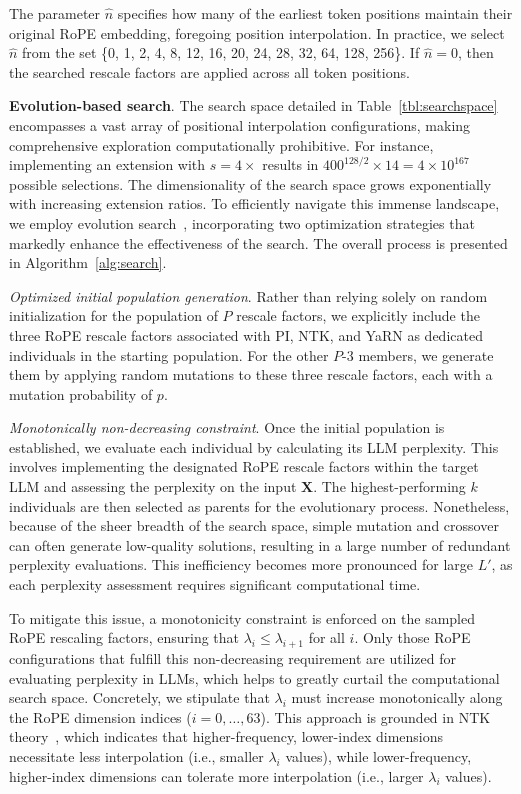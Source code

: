 The parameter $\hat{n}$ specifies how many of the earliest token positions maintain their original RoPE embedding, foregoing position interpolation. In practice, we select $\hat{n}$ from the set \{0, 1, 2, 4, 8, 12, 16, 20, 24, 28, 32, 64, 128, 256\}. If $\hat{n}=0$, then the searched rescale factors are applied across all token positions.

\textbf{Evolution-based search}. The search space detailed in Table~\ref{tbl:searchspace} encompasses a vast array of positional interpolation configurations, making comprehensive exploration computationally prohibitive. For instance, implementing an extension with $s=4\times$ results in $400^{128/2}\times14=4\times10^{167}$ possible selections. The dimensionality of the search space grows exponentially with increasing extension ratios. To efficiently navigate this immense landscape, we employ evolution search~\cite{guo2020single}, incorporating two optimization strategies that markedly enhance the effectiveness of the search. The overall process is presented in Algorithm~\ref{alg:search}.

\textit{Optimized initial population generation}. Rather than relying solely on random initialization for the population of $P$ rescale factors, we explicitly include the three RoPE rescale factors associated with PI, NTK, and YaRN as dedicated individuals in the starting population. For the other $P$-3 members, we generate them by applying random mutations to these three rescale factors, each with a mutation probability of $p$.

\textit{Monotonically non-decreasing constraint}. Once the initial population is established, we evaluate each individual by calculating its LLM perplexity. This involves implementing the designated RoPE rescale factors within the target LLM and assessing the perplexity on the input $\mathbf{X}$. The highest-performing $k$ individuals are then selected as parents for the evolutionary process. Nonetheless, because of the sheer breadth of the search space, simple mutation and crossover can often generate low-quality solutions, resulting in a large number of redundant perplexity evaluations. This inefficiency becomes more pronounced for large $L'$, as each perplexity assessment requires significant computational time.

To mitigate this issue, a monotonicity constraint is enforced on the sampled RoPE rescaling factors, ensuring that $\lambda_i\le \lambda_{i+1}$ for all $i$. Only those RoPE configurations that fulfill this non-decreasing requirement are utilized for evaluating perplexity in LLMs, which helps to greatly curtail the computational search space. Concretely, we stipulate that $\lambda_i$ must increase monotonically along the RoPE dimension indices ($i=0, \ldots, 63$). This approach is grounded in NTK theory~\cite{jacot2018neural,tancik2020fourier,ntk}, which indicates that higher-frequency, lower-index dimensions necessitate less interpolation (i.e., smaller $\lambda_i$ values), while lower-frequency, higher-index dimensions can tolerate more interpolation (i.e., larger $\lambda_i$ values).

